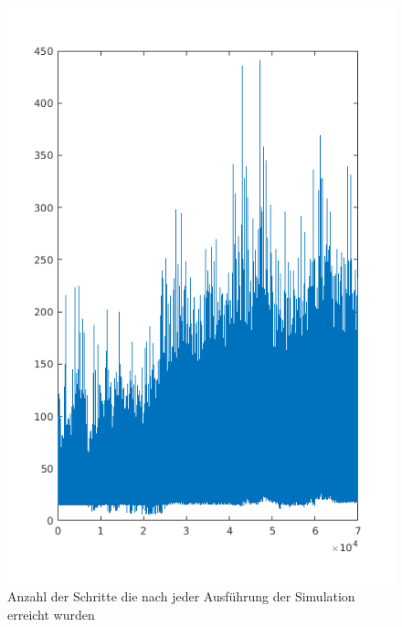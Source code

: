 \documentclass{hbrs-ecta-report}
\begin{document}
\begin{figure}[h!]
	\includegraphics[width=0.8\linewidth]{img/poleSteps}
	\caption{Anzahl der Schritte die nach jeder Ausführung der Simulation erreicht wurden}
	\label{fig:steps}
\end{figure}
\end{document}

